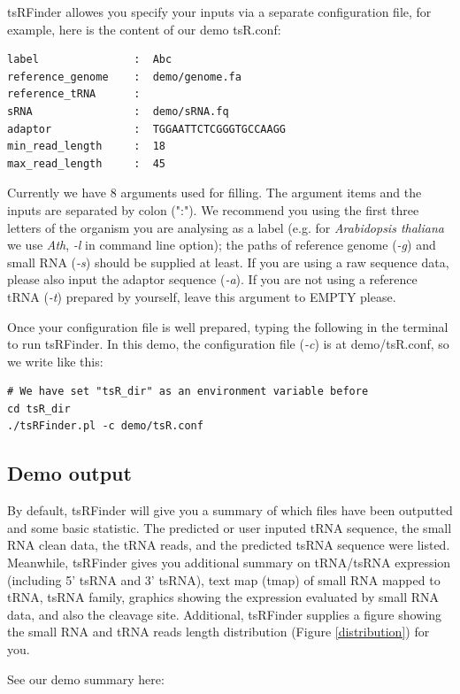 \documentclass[11pt, a4paper]{article}
\begin{document}
tsRFinder allowes you specify your inputs via a separate configuration file, for example, here is the content of our demo tsR.conf:

\begin{verbatim}
label               :  Abc
reference_genome    :  demo/genome.fa 
reference_tRNA      :
sRNA                :  demo/sRNA.fq
adaptor             :  TGGAATTCTCGGGTGCCAAGG
min_read_length     :  18
max_read_length     :  45
\end{verbatim}

Currently we have 8 arguments used for filling. The argument items and the inputs are separated by colon (":"). We recommend you using the first three letters of the organism you are analysing as a label (e.g. for \textit{Arabidopsis thaliana} we use \textit{Ath}, \emph{-l} in command line option); the paths of reference genome (\emph{-g}) and small RNA (\emph{-s}) should be supplied at least. If you are using a raw sequence data, please also input the adaptor sequence (\emph{-a}). If you are not using a reference tRNA (\emph{-t}) prepared by yourself, leave this argument to EMPTY please.

Once your configuration file is well prepared, typing the following in the terminal to run tsRFinder. In this demo, the configuration file (\emph{-c}) is at demo/tsR.conf, so we write like this:

\begin{verbatim}
# We have set "tsR_dir" as an environment variable before
cd tsR_dir
./tsRFinder.pl -c demo/tsR.conf
\end{verbatim}

\subsection{Demo output}

By default, tsRFinder will give you a summary of which files have been outputted and some basic statistic. The predicted or user inputed tRNA sequence, the small RNA clean data, the tRNA reads, and the predicted tsRNA sequence were listed. Meanwhile, tsRFinder gives you additional summary on tRNA/tsRNA expression (including 5' tsRNA and 3' tsRNA), text map (tmap) of small RNA mapped to tRNA, tsRNA family, graphics showing the expression evaluated by small RNA data, and also the cleavage site. Additional, tsRFinder supplies a figure showing the small RNA and tRNA reads length distribution (Figure \ref{distribution}) for you.

See our demo summary here:
\end{document}
